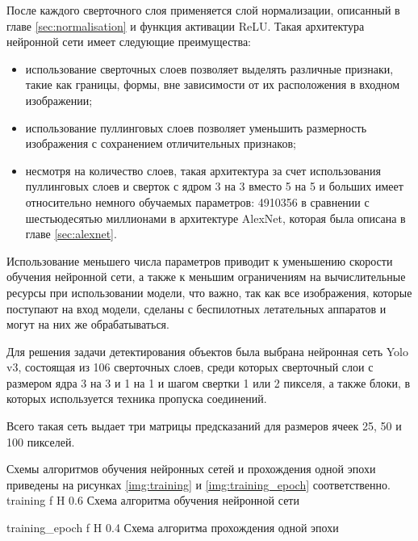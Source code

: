 После каждого сверточного слоя применяется слой нормализации, описанный в главе \ref{sec:normalisation} и функция активации ReLU. Такая архитектура нейронной сети имеет следующие преимущества:
\begin{itemize}
	\item использование сверточных слоев позволяет выделять различные признаки, такие как границы, формы, вне зависимости от их расположения в входном изображении;
	\item использование пуллинговых слоев позволяет уменьшить размерность изображения с сохранением отличительных признаков;
	\item несмотря на количество слоев, такая архитектура за счет использования пуллинговых слоев и сверток с ядром 3 на 3 вместо 5 на 5 и больших имеет относительно немного обучаемых параметров: 4910356 в сравнении с шестьюдесятью миллионами в архитектуре AlexNet, которая была описана в главе \ref{sec:alexnet}.
\end{itemize}

Использование меньшего числа параметров приводит к уменьшению скорости обучения нейронной сети, а также к меньшим ограничениям на вычислительные ресурсы при использовании модели, что важно, так как все изображения, которые поступают на вход модели, сделаны с беспилотных летательных аппаратов и могут на них же обрабатываться.

Для решения задачи детектирования объектов была выбрана нейронная сеть Yolo v3, состоящая из 106 сверточных слоев, среди которых сверточный слои с размером ядра 3 на 3 и 1 на 1 и шагом свертки 1 или 2 пикселя, а также блоки, в которых используется техника пропуска соединений.

Всего такая сеть выдает три матрицы предсказаний для размеров ячеек 25, 50 и 100 пикселей.

Схемы алгоритмов обучения нейронных сетей и прохождения одной эпохи приведены на рисунках \ref{img:training} и \ref{img:training_epoch} соответственно.
{training} %
{f} %
{H} %
{0.6\textwidth} %
{Схема алгоритма обучения нейронной сети} %

{training_epoch} %
{f} %
{H} %
{0.4\textwidth} %
{Схема алгоритма прохождения одной эпохи} %

